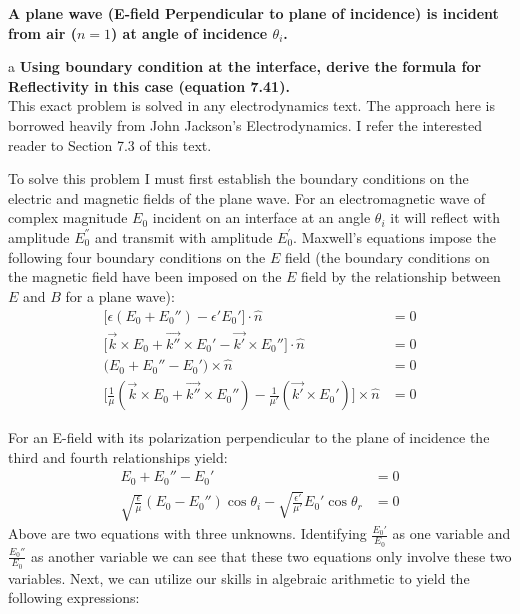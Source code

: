 \begin{homeworkProblem}
\textbf{A plane wave (E-field Perpendicular to plane of incidence) is incident from air ($n=1$) at angle
of incidence $\theta_i$.}

\begin{homeworkSection}{a}
\textbf{Using boundary condition at the interface, derive the formula for Reflectivity in this case
(equation 7.41).}
\\

This exact problem is solved in any electrodynamics text. The approach here is borrowed heavily from John Jackson's Electrodynamics. I refer the interested reader to Section 7.3 of this text.

To solve this problem I must first establish the boundary conditions on the electric and magnetic fields of the plane wave. For an electromagnetic wave of complex magnitude $E_0$ incident on an interface at an angle $\theta_i$ it will reflect with amplitude $E_0^{''}$ and transmit with amplitude $E_0^{'}$. Maxwell's equations impose the following four boundary conditions on the $E$ field (the boundary conditions on the magnetic field have been imposed on the $E$ field by the relationship between $E$ and $B$ for a plane wave):
\begin{align*}
   \big[ \epsilon (E_0 + E_0'')- \epsilon'E_0' \big]  \cdot \hat{n} &= 0 \\
   \big[\vec{k}\times E_0 +\vec{k''}\times E_0'-\vec{k'}\times E_0''\big]\cdot \hat{n} &= 0 \\
   \big(E_0 + E_0'' - E_0'\big)\times \hat{n} &= 0 \\ 
   \big[ \frac{1}{\mu}(\vec{k}\times E_0 + \vec{k''}\times E_0'') - \frac{1}{\mu'}(\vec{k'} \times E_0') \big] \times \hat{n} &= 0
\end{align*}

For an E-field with its polarization perpendicular to the plane of incidence the third and fourth relationships yield:
\begin{align*}
   E_0 + E_0''-E_0' &= 0 \\
   \sqrt{\frac{\epsilon}{\mu}}(E_0 - E_0'')\cos\theta_i - \sqrt{\frac{\epsilon'}{\mu'}}E_0'\cos\theta_r & = 0
\end{align*}
Above are two equations with three unknowns. Identifying $\frac{E_0'}{E_0}$ as one variable and $\frac{E_0''}{E_0}$ as another variable we can see that these two equations only involve these two variables. Next, we can utilize our skills in algebraic arithmetic to yield the following expressions:


\end{homeworkSection}
\end{homeworkProblem}

